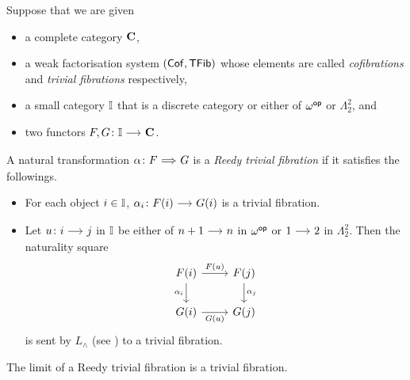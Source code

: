 \documentclass[a4paper,  dvipsnames, 11pt]{amsart}
\begin{document}
\begin{definition}
	\label{defn:ReedyTrivFib}
	Suppose that we are given
	\begin{itemize}
		\item %
			a complete category $\mathbf{C}$,
		\item %
			a weak factorisation system $(\mathsf{Cof},\mathsf{TFib})$
			whose elements are called \textit{cofibrations} and \textit{trivial fibrations} respectively,
		\item %
			a small category $\mathbb{I}$ that is a discrete category or either of $\omega^{\mathsf{op}}$ or $\Lambda^2_2$,
			and
		\item %
			two functors $F,G\colon\dI\arr\one{C}$.
	\end{itemize}
	A natural transformation $\alpha\colon F\arr[Rightarrow]G$
	is a
	\emph{Reedy trivial fibration}
	if it satisfies the followings.
	\begin{itemize}
		\item %
			For each object $i\in\mathbb{I}$, $\alpha_i\colon F(i)\arr G(i)$ is a trivial fibration.
		\item %
			Let $u\colon i\arr j$ in $\mathbb{I}$ be either of $n+1\arr n$ in $\omega^{\mathsf{op}}$ or $1\arr 2$ in $\Lambda^2_2$.
			Then the naturality square
			\[
				\begin{tikzcd}
					F(i)
					\ar[r,"F(u)"]
					\ar[d,"\alpha_i"']
						&
						F(j)
						\ar[d,"\alpha_j"]
					\\
					G(i)
					\ar[r,"G(u)"']
						&
						G(j)
				\end{tikzcd}
			\]
			is sent by $L_\land$ (see ) to a trivial fibration.
		\qedhere %
	\end{itemize}
\end{definition}
\begin{proposition}
	\label{prop:ReedyLimit}
	The limit of a Reedy trivial fibration is a trivial fibration.
\end{proposition}
\end{document}
